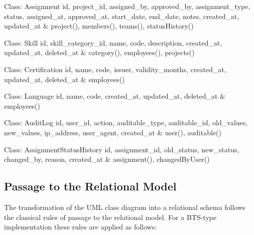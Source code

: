 \documentclass{bts-report}
\begin{document}
\begin{classtable}{Class: Assignment}
id, project\_id, assigned\_by, approved\_by, assignment\_type, status, assigned\_at, approved\_at, start\_date, end\_date, notes, created\_at, updated\_at & project(), members(), teams(), statusHistory() \\
\end{classtable}

\begin{classtable}{Class: Skill}
id, skill\_category\_id, name, code, description, created\_at, updated\_at, deleted\_at & category(), employees(), projects() \\
\end{classtable}

\begin{classtable}{Class: Certification}
id, name, code, issuer, validity\_months, created\_at, updated\_at, deleted\_at & employees() \\
\end{classtable}

\begin{classtable}{Class: Language}
id, name, code, created\_at, updated\_at, deleted\_at & employees() \\
\end{classtable}

\begin{classtable}{Class: AuditLog}
id, user\_id, action, auditable\_type, auditable\_id, old\_values, new\_values, ip\_address, user\_agent, created\_at & user(), auditable() \\
\end{classtable}

\begin{classtable}{Class: AssignmentStatusHistory}
id, assignment\_id, old\_status, new\_status, changed\_by, reason, created\_at & assignment(), changedByUser() \\
\end{classtable}

\subsection{Passage to the Relational Model}

The transformation of the UML class diagram into a relational schema follows the classical rules of passage to the relational model. For a BTS-type implementation these rules are applied as follows:
\end{document}
